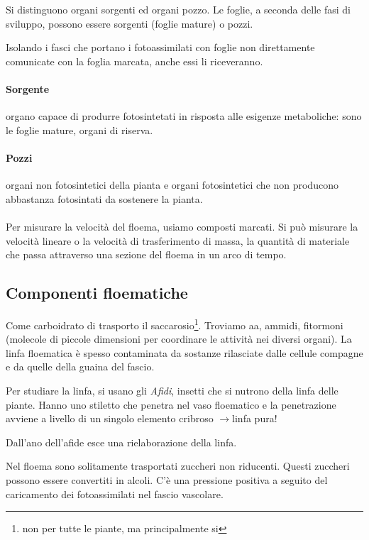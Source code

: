 \documentclass[a4paper,12pt]{book}
\newcommand{\lfreccia}{\ensuremath{\longrightarrow}}
\begin{document}
Si distinguono organi sorgenti ed organi pozzo. Le foglie, a seconda delle fasi di sviluppo, possono essere sorgenti (foglie mature) o pozzi. 

Isolando i fasci che portano i fotoassimilati con foglie non direttamente comunicate con la foglia marcata, anche essi li riceveranno.

\paragraph{Sorgente} organo capace di produrre fotosintetati in risposta alle esigenze metaboliche: sono le foglie mature, organi di riserva.
\paragraph{Pozzi} organi non fotosintetici della pianta e organi fotosintetici che non producono abbastanza  fotosintati da sostenere la pianta.

\paragraph{}
Per misurare la velocità del floema, usiamo composti marcati. Si può misurare la velocità lineare o la velocità di trasferimento di massa, la quantità di materiale che passa attraverso una sezione del floema in un arco di tempo.

\subsection{Componenti floematiche}
Come carboidrato di trasporto il saccarosio\footnote{non per tutte le piante, ma principalmente si}. Troviamo aa, ammidi, fitormoni (molecole di piccole dimensioni per coordinare le attività nei diversi organi). La linfa floematica è spesso contaminata da sostanze rilasciate dalle cellule compagne e da quelle della guaina del fascio. 

Per studiare la linfa, si usano gli \emph{Afidi}, insetti che si nutrono della linfa delle piante. Hanno uno stiletto che penetra nel vaso floematico e la penetrazione avviene a livello di un singolo elemento cribroso \lfreccia linfa pura!

Dall'ano dell'afide esce una rielaborazione della linfa.

Nel floema sono solitamente trasportati zuccheri non riducenti. Questi zuccheri possono essere convertiti in alcoli. 
C'è una pressione positiva a seguito del caricamento dei fotoassimilati nel fascio vascolare.
\end{document}
